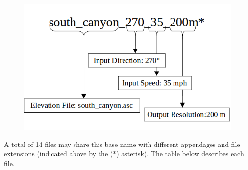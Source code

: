 \documentclass[12pt]{article}
\begin{document}
\begin{figure}[H]
	\label{}
	\centering
	\includegraphics[scale=1.0]{file_desc}
\end{figure}

A total of 14 files may share this base name with different appendages and file extensions (indicated above by the (*) asterisk).  The table below describes each file.
\newline
\end{document}
